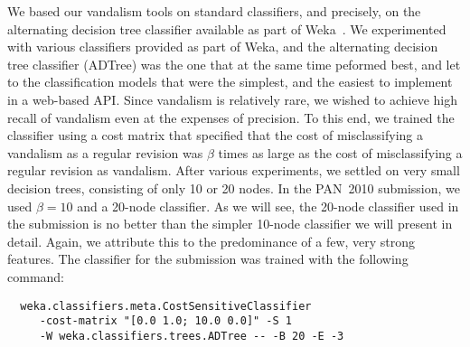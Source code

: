 We based our vandalism tools on standard classifiers, and precisely, on the alternating decision tree classifier available as part of Weka~\cite{Weka09}.
We experimented with various classifiers provided as part of Weka, and the alternating decision tree classifier (ADTree) was the one that at the same time peformed best, and let to the classification models that were the simplest, and the easiest to implement in a web-based API.
Since vandalism is relatively rare, we wished to achieve high recall of vandalism even at the expenses of precision.
To this end, we trained the classifier using a cost matrix that specified that the cost of misclassifying a vandalism as a regular revision was $\beta$ times as large as the cost of misclassifying a regular revision as vandalism.
After various experiments, we settled on very small decision trees, consisting of only 10 or 20 nodes.
In the PAN~2010 submission, we used $\beta=10$ and a 20-node classifier.
As we will see, the 20-node classifier used in the submission is no better than the simpler 10-node classifier we will present in detail.
Again, we attribute this to the predominance of a few, very strong features.
The classifier for the submission was trained with the following command:
%
{\small
\begin{verbatim}
  weka.classifiers.meta.CostSensitiveClassifier
     -cost-matrix "[0.0 1.0; 10.0 0.0]" -S 1
     -W weka.classifiers.trees.ADTree -- -B 20 -E -3
\end{verbatim}
}

